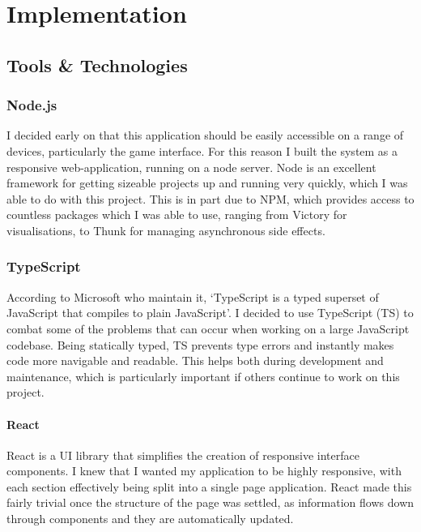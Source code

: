 \chapter{Implementation}


\section{Tools \& Technologies}

\subsection{Node.js}
I decided early on that this application should be easily accessible on a range of devices, particularly the game interface. For this reason I built the system as a responsive web-application, running on a node server. Node\cite{Node} is an excellent framework for getting sizeable projects up and running very quickly, which I was able to do with this project. This is in part due to NPM\cite{npm}, which provides access to countless packages which I was able to use, ranging from Victory\cite{Victory} for visualisations, to Thunk\cite{Thunk} for managing asynchronous side effects.

\subsection{TypeScript}
According to Microsoft who maintain it, `TypeScript is a typed superset of JavaScript that compiles to plain JavaScript'\cite{Typescript}. 
I decided to use TypeScript (TS) to combat some of the problems that can occur when working on a large JavaScript codebase. 
Being statically typed, TS prevents type errors and instantly makes code more navigable and readable. 
This helps both during development and maintenance, which is particularly important if others continue to work on this project.

\subsubsection{React}
React\cite{React} is a UI library that simplifies the creation of responsive interface components. I knew that I wanted my application to be highly responsive, with each section effectively being split into a single page application. React made this fairly trivial once the structure of the page was settled, as information flows down through components and they are automatically updated.

